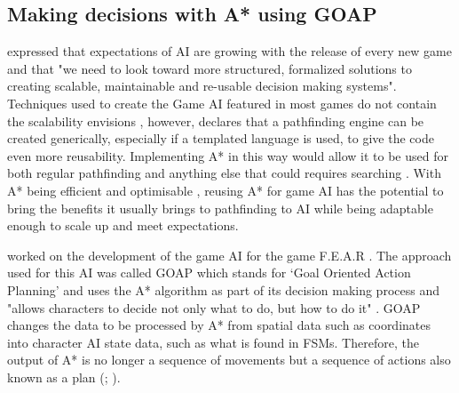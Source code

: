 \documentclass[11pt, a4paper]{report}
\begin{document}
\subsection{Making decisions with A* using GOAP}
\label{subsec:makingDecisionsWithAStarUsingGOAP}

\citeauthor{orkin2003applying} \parencite*[11]{orkin2003applying} expressed that expectations of AI are growing with the release of every new game and that "we need to look toward more structured, formalized solutions to creating scalable, maintainable and re-usable decision making systems". Techniques used to create the Game AI featured in most games do not contain the scalability \citeauthor{orkin2003applying} envisions \parencite[17]{laird2001human}, however, \citeauthor{higgins2002generic} \parencite*[117]{higgins2002generic} declares that a pathfinding engine can be created generically, especially if a templated language is used, to give the code even more reusability. Implementing A* in this way would allow it to be used for both regular pathfinding and anything else that could requires searching \parencite[120]{higgins2002generic}. With A* being efficient and optimisable \parencite[215]{millington2019ai}, reusing A* for game AI has the potential to bring the benefits it usually brings to pathfinding to AI while being adaptable enough to scale up and meet expectations.

\citeauthor{orkin2006three} \parencite*[1]{orkin2006three} worked on the development of the game AI for the game F.E.A.R \parencite{FEAR}. The approach used for this AI was called GOAP which stands for `Goal Oriented Action Planning' and uses the A* algorithm as part of its decision making process and "allows characters to decide not only what to do, but how to do it" \parencite[1]{orkin2003applying}. GOAP changes the data to be processed by A* from spatial data such as coordinates into character AI state data, such as what is found in FSMs. Therefore, the output of A* is no longer a sequence of movements but a sequence of actions also known as a plan (\cite[2]{orkin2003applying}; \cite[6]{tozour2002evolution}).
\end{document}
